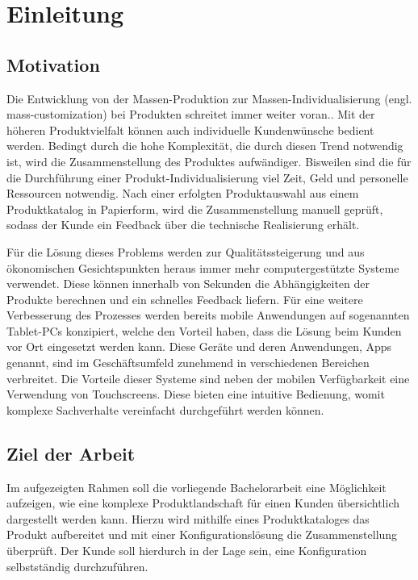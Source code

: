 \chapter{Einleitung}
\section{Motivation} \label{aufgaben}
Die Entwicklung von der Massen-Produktion zur Massen-Individualisierung (engl. mass-customization) bei Produkten schreitet immer weiter voran.\cite{bib:massCustomization}. Mit der höheren Produktvielfalt können auch individuelle Kundenwünsche bedient werden. Bedingt durch die hohe Komplexität, die durch diesen Trend notwendig ist, wird die Zusammenstellung des Produktes aufwändiger. Bisweilen sind die für die Durchführung einer Produkt-Individualisierung viel Zeit, Geld und personelle Ressourcen notwendig.
Nach einer erfolgten Produktauswahl aus einem Produktkatalog in Papierform, wird die Zusammenstellung manuell geprüft, sodass der Kunde ein Feedback über die technische Realisierung erhält. \par

Für die Lösung dieses Problems werden zur Qualitätssteigerung und aus ökonomischen Gesichtspunkten heraus immer mehr computergestützte Systeme verwendet. Diese können innerhalb von Sekunden die Abhängigkeiten der Produkte berechnen und ein schnelles Feedback liefern. Für eine weitere Verbesserung des Prozesses werden bereits mobile Anwendungen auf sogenannten Tablet-PCs konzipiert, welche den Vorteil haben, dass die Lösung beim Kunden vor Ort eingesetzt werden kann. Diese Geräte und deren Anwendungen, Apps genannt, sind im Geschäftsumfeld zunehmend in verschiedenen Bereichen verbreitet\cite{bib:businessApps}. Die Vorteile dieser Systeme sind neben der mobilen Verfügbarkeit eine Verwendung von Touchscreens. Diese bieten eine intuitive Bedienung, womit komplexe Sachverhalte vereinfacht durchgeführt werden können.
 
\section{Ziel der Arbeit} \label{goal}
Im aufgezeigten Rahmen soll die vorliegende Bachelorarbeit eine Möglichkeit aufzeigen, wie eine komplexe Produktlandschaft für einen Kunden übersichtlich dargestellt werden kann. Hierzu wird mithilfe eines Produktkataloges das Produkt aufbereitet und mit einer Konfigurationslösung die Zusammenstellung überprüft. Der Kunde soll hierdurch in der Lage sein, eine Konfiguration selbstständig durchzuführen. 

